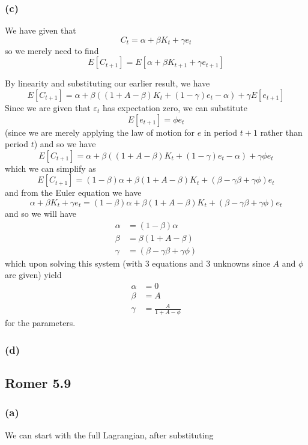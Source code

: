 \documentclass[11pt]{amsart}
\begin{document}
\subsubsection*{(c)}

We have given that 
\[
C_t = \alpha + \beta K_t + \gamma e_t 
\]
so we merely need to find 
\[
E[C_{t+1}] = E[\alpha + \beta K_{t+1} + \gamma e_{t+1}]
\]

By linearity and substituting our earlier result, we have
\[
E[C_{t+1}] = \alpha + \beta ((1 + A - \beta) K_t + (1-\gamma) e_t - \alpha) + \gamma E[e_{t+1}]
\]
Since we are given that $\varepsilon_t$ has expectation zero, we can substitute
\[
E[e_{t+1}] = \phi e_t
\]
(since we are merely applying the law of motion for $e$ in period $t+1$ rather than period $t$) and so we have
\[
E[C_{t+1}] = \alpha + \beta ((1 + A - \beta) K_t + (1-\gamma) e_t - \alpha) + \gamma \phi e_t
\]
which we can simplify as
\[
E[C_{t+1}] = (1 - \beta) \alpha + \beta (1 + A - \beta) K_t + (\beta - \gamma \beta + \gamma \phi) e_t
\]
and from the Euler equation we have
\[
\alpha + \beta K_t + \gamma e_t  = (1 - \beta) \alpha + \beta (1 + A - \beta) K_t + (\beta - \gamma \beta + \gamma \phi) e_t
\]
and so we will have
\begin{align*}
\alpha &= (1 - \beta) \alpha \\
\beta &= \beta (1 + A - \beta) \\
\gamma &= (\beta - \gamma \beta + \gamma \phi)
\end{align*}
which upon solving this system (with 3 equations and 3 unknowns since $A$ and $\phi$ are given) yield
\begin{align*}
\alpha &= 0 \\
\beta &= A\\
\gamma &= \frac{A}{1 + A - \phi}
\end{align*}
for the parameters.

\subsubsection*{(d)}

\subsection{Romer 5.9}

\subsubsection*{(a)}

We can start with the full Lagrangian, after substituting
\end{document}
